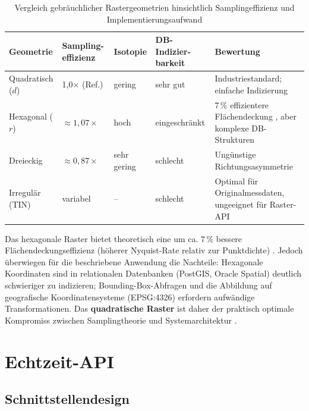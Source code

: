 ﻿\documentclass[a4paper,12pt]{article}
\theoremstyle{definition}
\begin{document}
\begin{table}[h]
\centering
\caption{Vergleich gebräuchlicher Rastergeometrien hinsichtlich
         Samplingeffizienz und Implementierungsaufwand}
\label{tab:geometrien}
\renewcommand{\arraystretch}{1.4}
\begin{tabular}{@{}p{3.0cm}p{2.5cm}p{2.5cm}p{2.5cm}p{3.5cm}@{}}
\toprule
\textbf{Geometrie} & \textbf{Sampling-\newline effizienz} & \textbf{Isotopie}
  & \textbf{DB-Indizier-\newline barkeit} & \textbf{Bewertung} \\
\midrule
Quadratisch ($d$) & 1{,}0$\times$ (Ref.) & gering & sehr gut
  & Industriestandard; einfache Indizierung \\
Hexagonal ($r$) & $\approx 1{,}07\times$ & hoch & eingeschränkt
  & 7\,\% effizientere Flächendeckung \cite{conway2013},
    aber komplexe DB-Strukturen \\
Dreieckig & $\approx 0{,}87\times$ & sehr gering & schlecht
  & Ungünstige Richtungsasymmetrie \\
Irregulär (TIN) & variabel & -- & schlecht
  & Optimal für Originalmessdaten, ungeeignet für Raster-API \\
\bottomrule
\end{tabular}
\end{table}

\noindent
Das hexagonale Raster bietet theoretisch eine um ca. $7\,\%$
bessere Flächendeckungseffizienz (höherer Nyquist-Rate relativ
zur Punktdichte) \cite{conway2013}. Jedoch überwiegen für die
beschriebene Anwendung die Nachteile: Hexagonale Koordinaten sind
in relationalen Datenban\-ken (PostGIS, Oracle Spatial) deutlich
schwieriger zu indizieren; Bounding-Box-Abfragen und die Abbildung
auf geografische Koordinatensysteme (EPSG:4326) erfordern aufwändige
Transformationen. Das \textbf{quadratische Raster} ist daher der
praktisch optimale Kompromiss zwischen Samplingtheorie und
Systemarchitektur \cite{li2008}.

\section{Echtzeit-API}

\subsection{Schnittstellendesign}
\end{document}
